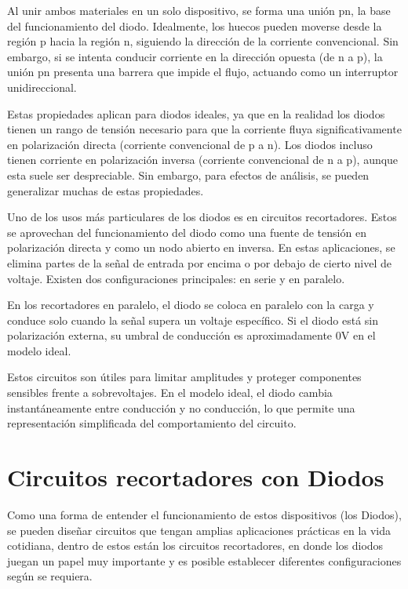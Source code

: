 \documentclass[journal]{IEEEtran}
\begin{document}
Al unir ambos materiales en un solo dispositivo, se forma una unión pn, la base del funcionamiento del diodo. Idealmente, los huecos pueden moverse desde la región p hacia la región n, siguiendo la dirección de la corriente convencional. Sin embargo, si se intenta conducir corriente en la dirección opuesta (de n a p), la unión pn presenta una barrera que impide el flujo, actuando como un interruptor unidireccional.

Estas propiedades aplican para diodos ideales, ya que en la realidad los diodos tienen un rango de tensión necesario para que la
corriente fluya significativamente en polarización directa (corriente convencional de p a n). Los diodos incluso tienen corriente en polarización inversa (corriente convencional de n a p), aunque esta suele ser despreciable. Sin embargo, para efectos de análisis, se pueden 
generalizar muchas de estas propiedades.

Uno de los usos más particulares de los diodos es en circuitos recortadores. Estos se aprovechan del funcionamiento del diodo como una fuente de tensión en polarización directa
y como un nodo abierto en inversa. En estas aplicaciones, se elimina partes de la señal de entrada por encima o por debajo de cierto nivel de voltaje. Existen dos configuraciones principales: en serie y en paralelo.  

En los recortadores en paralelo, el diodo se coloca en paralelo con la carga y conduce solo cuando la señal supera un voltaje específico. Si el diodo está sin polarización externa, su umbral de conducción es aproximadamente 0V en el modelo ideal.   

Estos circuitos son útiles para limitar amplitudes y proteger componentes sensibles frente a sobrevoltajes. En el modelo ideal, el diodo cambia instantáneamente entre conducción y no conducción, lo que permite una representación simplificada del comportamiento del circuito. \cite{Boylestad}


\section{Circuitos recortadores con Diodos}
Como una forma de entender el funcionamiento de estos dispositivos (los Diodos), se pueden diseñar circuitos que tengan amplias aplicaciones prácticas en la vida cotidiana,
dentro de estos están los circuitos recortadores, en donde los diodos juegan un papel muy importante y es posible establecer diferentes configuraciones según se requiera. 
\end{document}
